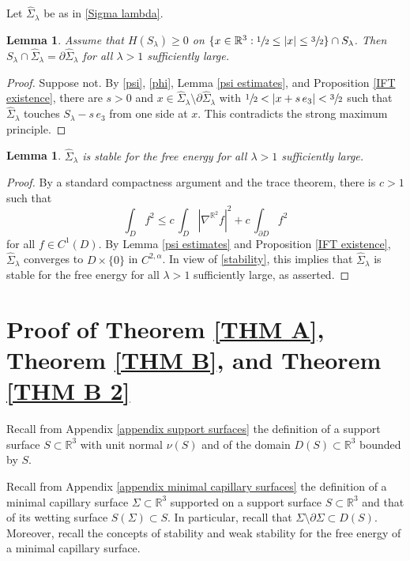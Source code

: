 \documentclass[11pt]{amsart}
\newtheorem{lem}[prop]{Lemma}
\begin{document}
Let $\hat \Sigma_\lambda$ be as in \eqref{Sigma lambda}. 
\begin{lem} \label{admissible mp}
Assume that $H(S_\lambda)\geq 0$ on $\{x\in \mathbb{R}^3:\sfrac12\leq |x|\leq \sfrac32\}\cap S_\lambda$. Then $S_\lambda\cap \hat \Sigma_\lambda=\partial \hat \Sigma_\lambda$ for all $\lambda>1$ sufficiently large.
\end{lem}
\begin{proof}
	Suppose not. By \eqref{psi}, \eqref{phi}, Lemma \ref{psi estimates}, and Proposition \ref{IFT existence},  there are $s>0$ and $x\in \hat \Sigma_\lambda\setminus \partial \hat\Sigma_\lambda$ with $\sfrac12<|x+s\,e_3|<\sfrac32$ such that $\hat \Sigma_\lambda$ touches $S_\lambda-s\,e_3$ from one side 
	 at $x$. This contradicts the strong maximum principle.
\end{proof}
\begin{lem} \label{stable coro}
 $\hat \Sigma_\lambda$ is stable for the free energy for all $\lambda>1$ sufficiently large.
\end{lem}
\begin{proof}
	By a standard compactness argument and the trace  theorem,  
	there is $c>1$ such that
	$$
\int_{D}f^2\leq c\,\int_{D}	|\nabla^{\mathbb{R}^2}f|^2+c\,\int_{\partial D}f^2
	$$
	for all $f\in C^{1}(D)$. By Lemma \ref{psi estimates} and Proposition \ref{IFT existence}, $\hat \Sigma_\lambda$ converges to $D\times \{0\}$ in $C^{2,\alpha}$. In view of \eqref{stability}, this implies that $\hat \Sigma_\lambda$ is stable for the free energy for all $\lambda>1$ sufficiently large, as asserted.
\end{proof}
\section{Proof of Theorem \ref{THM A}, Theorem \ref{THM B}, and Theorem \ref{THM B 2}}
	Recall from Appendix \ref{appendix support surfaces} the definition of a support surface $S\subset \mathbb{R}^3$ with unit normal $\nu(S)$ and of the domain $D(S)\subset \mathbb{R}^3$ bounded by $S$.  



Recall from Appendix \ref{appendix minimal capillary surfaces}  the  definition of a minimal capillary surface $\Sigma \subset \mathbb{R}^3$ supported on a support surface $S\subset \mathbb{R}^3$  and that of its  wetting surface $S(\Sigma)\subset S$. In particular, recall that  $\Sigma\setminus \partial \Sigma \subset D(S)$.  Moreover, recall the concepts of  stability and weak stability for the free energy  of a minimal capillary surface.
\end{document}
